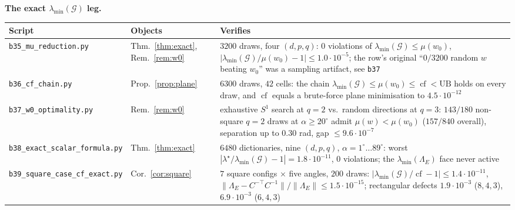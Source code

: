 \documentclass[11pt]{article}
\theoremstyle{remark}
\newcommand{\Gr}{\mathcal{G}}
\newcommand{\Le}{\Lambda_E}
\begin{document}
\noindent\textbf{The exact $\lambda_{\min}(\Gr)$ leg.}
\begin{center}\footnotesize\begin{tabular}{@{}>{\raggedright\arraybackslash}p{5.1cm}%
>{\raggedright\arraybackslash}p{2.5cm}>{\raggedright\arraybackslash}p{5.8cm}@{}}
\toprule Script & Objects & Verifies\\
\midrule
\texttt{b35\_mu\_reduction.py} & Thm.~\ref{thm:exact}, Rem.~\ref{rem:w0} & $3200$ draws, four $(d,p,q)$:
$0$ violations of $\lambda_{\min}(\Gr)\le\mu(w_0)$,
$|\lambda_{\min}(\Gr)/\mu(w_0)-1|\le1.0\cdot10^{-5}$; the row's original ``$0/3200$ random $w$
beating $w_0$'' was a sampling artifact, see \texttt{b37}\\
\texttt{b36\_cf\_chain.py} & Prop.~\ref{prop:plane} & $6300$ draws, $42$ cells: the chain
$\lambda_{\min}(\Gr)\le\mu(w_0)\le\operatorname{cf}<\mathrm{UB}$ holds on every draw, and
$\operatorname{cf}$ equals a brute-force plane minimisation to $4.5\cdot10^{-12}$\\
\texttt{b37\_w0\_optimality.py} & Rem.~\ref{rem:w0} & exhaustive $S^1$ search at $q=2$ vs.\ random
directions at $q=3$: $143/180$ non-square $q=2$ draws at $\alpha\ge20^\circ$ admit $\mu(w)<\mu(w_0)$
($157/840$ overall), separation up to $0.30$ rad, gap $\le9.6\cdot10^{-7}$\\
\texttt{b38\_exact\_scalar\_formula.py} & Thm.~\ref{thm:exact} & $6480$ dictionaries, nine $(d,p,q)$,
$\alpha=1^\circ\ldots89^\circ$: worst $|\lambda^\star/\lambda_{\min}(\Gr)-1|=1.8\cdot10^{-11}$,
$0$ violations; the $\lambda_{\min}(\Le)$ face never active\\
\texttt{b39\_square\_case\_cf\_exact.py} & Cor.~\ref{cor:square} & $7$ square configs $\times$ five
angles, $200$ draws: $|\lambda_{\min}(\Gr)/\operatorname{cf}-1|\le1.4\cdot10^{-11}$,
$\|\Le-C^{-\top}C^{-1}\|/\|\Le\|\le1.5\cdot10^{-15}$; rectangular defects
$1.9\cdot10^{-3}$ ($8,4,3$), $6.9\cdot10^{-3}$ ($6,4,3$)\\
\bottomrule
\end{tabular}\end{center}
\end{document}
